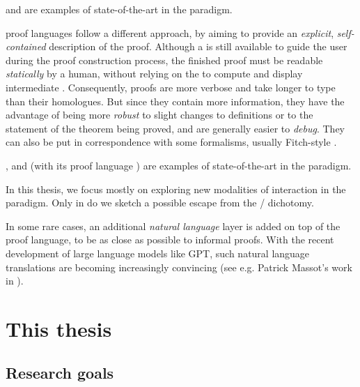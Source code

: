 \begin{description}[labelsep=0pt]
   and  are examples of state-of-the-art  in the
   paradigm.
  
  proof languages follow a different approach, by
  aiming to provide an \emph{explicit}, \emph{self-contained} description of the
  proof. Although a  is still available to guide the user during the
  proof construction process, the finished proof must be readable
  \emph{statically} by a human, without relying on the  to compute and
  display intermediate . Consequently,  proofs are more
  verbose and take longer to type than their  homologues. But since
  they contain more information, they have the advantage of being more
  \emph{robust} to slight changes to definitions or to the statement of the
  theorem being proved, and are generally easier to \emph{debug}. They can also
  be put in correspondence with some  formalisms, usually
  Fitch-style  \cite{geuvers_proof_2009}.
  
  \AP
  ,  and  (with its  proof
  language ) are examples of state-of-the-art  in the  paradigm.
\end{description}

\begin{emphpar}
  In this thesis, we focus mostly on exploring new modalities of interaction in
  the \emph{} paradigm. Only in  do we
  sketch a possible escape from the / dichotomy.
\end{emphpar}

\begin{remark}
In some rare cases, an additional \emph{natural language} layer is added on top
of the proof language, to be as close as possible to informal proofs. With the
recent development of large language models like GPT, such natural language
translations are becoming increasingly convincing (see e.g. Patrick Massot's
work in  \cite{LeanIPAM}).
\end{remark}


\section{This thesis}

\subsection{Research goals}

